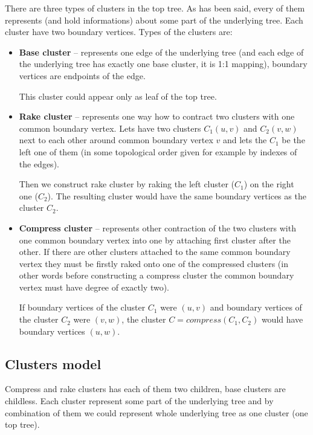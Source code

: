 There are three types of clusters in the top tree. As has been said, every of
them represents (and hold informations) about some part of the underlying tree.
Each cluster have two {\I boundary vertices}. Types of the clusters are:

\begin{itemize}

\item {\bf Base cluster} -- represents one edge of the underlying tree (and each
edge of the underlying tree has exactly one base cluster, it is 1:1 mapping),
boundary vertices are endpoints of the edge.

This cluster could appear only as leaf of the top tree.

\item {\bf Rake cluster} -- represents one way how to contract two clusters
with one common boundary vertex. Lets have two clusters $C_1(u,v)$ and
$C_2(v,w)$ next to each other around common boundary vertex $v$ and lets the
$C_1$ be the left one of them (in some topological order given for example by
indexes of the edges).

Then we construct {\I rake cluster} by {\I raking} the left cluster ($C_1$) on
the right one ($C_2$). The resulting cluster would have the same boundary
vertices as the cluster $C_2$.


\item{\bf Compress cluster} -- represents other contraction of the two clusters
with one common boundary vertex into one by attaching first cluster after the
other. If there are other clusters attached to the same common boundary vertex
they must be firstly {\I raked} onto one of the compressed clusters (in other words
before constructing a compress cluster the common boundary vertex must have
degree of exactly two).

If boundary vertices of the cluster $C_1$ were $(u,v)$ and boundary vertices
of the cluster $C_2$ were $(v,w)$, the cluster $C=compress(C_1,C_2)$ would have
boundary vertices $(u,w)$.


\end{itemize}

\subsection{Clusters model}

Compress and rake clusters has each of them two children, base clusters are
childless. Each cluster represent some part of the underlying tree and by
combination of them we could represent whole underlying tree as one cluster
(one top tree).

